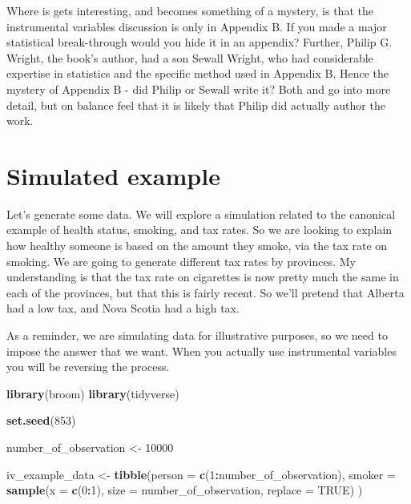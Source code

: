 \documentclass[
]{book}
\newenvironment{Shaded}{\begin{snugshade}}{\end{snugshade}}
\newcommand{\DataTypeTok}[1]{\textcolor[rgb]{0.13,0.29,0.53}{#1}}
\newcommand{\DecValTok}[1]{\textcolor[rgb]{0.00,0.00,0.81}{#1}}
\newcommand{\KeywordTok}[1]{\textcolor[rgb]{0.13,0.29,0.53}{\textbf{#1}}}
\newcommand{\NormalTok}[1]{#1}
\newcommand{\OperatorTok}[1]{\textcolor[rgb]{0.81,0.36,0.00}{\textbf{#1}}}
\newcommand{\OtherTok}[1]{\textcolor[rgb]{0.56,0.35,0.01}{#1}}
\newcommand{\StringTok}[1]{\textcolor[rgb]{0.31,0.60,0.02}{#1}}
\begin{document}
Where is gets interesting, and becomes something of a mystery, is that the instrumental variables discussion is only in Appendix B. If you made a major statistical break-through would you hide it in an appendix? Further, Philip G. Wright, the book's author, had a son Sewall Wright, who had considerable expertise in statistics and the specific method used in Appendix B. Hence the mystery of Appendix B - did Philip or Sewall write it? Both \citet{cunninghamnorap} and \citet{stock2003retrospectives} go into more detail, but on balance feel that it is likely that Philip did actually author the work.

\hypertarget{simulated-example-1}{%
\section{Simulated example}\label{simulated-example-1}}

Let's generate some data. We will explore a simulation related to the canonical example of health status, smoking, and tax rates. So we are looking to explain how healthy someone is based on the amount they smoke, via the tax rate on smoking. We are going to generate different tax rates by provinces. My understanding is that the tax rate on cigarettes is now pretty much the same in each of the provinces, but that this is fairly recent. So we'll pretend that Alberta had a low tax, and Nova Scotia had a high tax.

As a reminder, we are simulating data for illustrative purposes, so we need to impose the answer that we want. When you actually use instrumental variables you will be reversing the process.

\begin{Shaded}
\begin{Highlighting}[]
\KeywordTok{library}\NormalTok{(broom)}
\KeywordTok{library}\NormalTok{(tidyverse)}

\KeywordTok{set.seed}\NormalTok{(}\DecValTok{853}\NormalTok{)}

\NormalTok{number_of_observation <-}\StringTok{ }\DecValTok{10000}

\NormalTok{iv_example_data <-}\StringTok{ }\KeywordTok{tibble}\NormalTok{(}\DataTypeTok{person =} \KeywordTok{c}\NormalTok{(}\DecValTok{1}\OperatorTok{:}\NormalTok{number_of_observation),}
                          \DataTypeTok{smoker =} \KeywordTok{sample}\NormalTok{(}\DataTypeTok{x =} \KeywordTok{c}\NormalTok{(}\DecValTok{0}\OperatorTok{:}\DecValTok{1}\NormalTok{),}
                                          \DataTypeTok{size =}\NormalTok{ number_of_observation, }
                                          \DataTypeTok{replace =} \OtherTok{TRUE}\NormalTok{)}
\NormalTok{                          )}
\end{Highlighting}
\end{Shaded}
\end{document}
